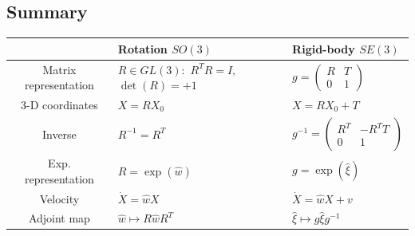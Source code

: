 \documentclass[oneside,fontsize=11pt,paper=a4]{scrartcl}
\begin{document}
\subsection*{Summary}%
\renewcommand{\arraystretch}{1.3}%
\begin{tabularx}{\linewidth}{|c|Y|Y|}
    \hline
     & Rotation $SO(3)$ & Rigid-body $SE(3)$ \\ \hline
     Matrix representation &  & $g = \begin{pmatrix}R & T\\0 & 1 \end{pmatrix}$ \\ -D coordinates & $X = RX_0$ & $X = RX_0 + T$ \\ \hline
     Inverse & $R^{-1} = R^T$ & $g^{-1} = \begin{pmatrix}R^T & -R^TT\\0 & 1 \end{pmatrix}$ \\ \hline
     Exp. representation & $R = \exp(\hat{w})$ & $g = \exp(\hat{\xi})$ \\ \hline
     Velocity & $\dot{X} = \hat{w}X$ & $\dot{X} = \hat{w}X + v$ \\ \hline
     Adjoint map & $\hat{w} \mapsto R \hat{w} R^T$ & $\hat{\xi} \mapsto g \hat{\xi} g^{-1}$ \\ \hline
\end{tabularx}
\renewcommand{\arraystretch}{1.0}%
\newpage
\end{document}
